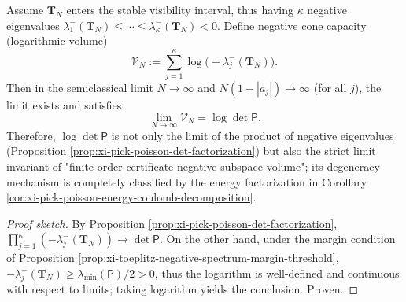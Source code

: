 \begin{corollary}\label{cor:xi-toeplitz-negative-log-volume-limit}
Assume \(\mathbf{T}_N\) enters the stable visibility interval, thus having \(\kappa\) negative eigenvalues
\(\lambda_1^{-}(\mathbf{T}_N)\le\cdots\le\lambda_{\kappa}^{-}(\mathbf{T}_N)<0\).
Define negative cone capacity (logarithmic volume)
\[
\mathcal{V}_N:=\sum_{j=1}^{\kappa}\log\bigl(-\lambda_j^{-}(\mathbf{T}_N)\bigr).
\]
Then in the semiclassical limit \(N\to\infty\) and \(N(1-|a_j|)\to\infty\) (for all \(j\)), the limit exists and satisfies
\[
\boxed{\;
\lim_{N\to\infty}\mathcal{V}_N=\log\det\mathsf P.\;}
\]
Therefore, \(\log\det\mathsf P\) is not only the limit of the product of negative eigenvalues (Proposition \ref{prop:xi-pick-poisson-det-factorization}) but also the strict limit invariant of "finite-order certificate negative subspace volume"; its degeneracy mechanism is completely classified by the energy factorization in Corollary \ref{cor:xi-pick-poisson-energy-coulomb-decomposition}.
\end{corollary}
\begin{proof}[Proof sketch]
By Proposition \ref{prop:xi-pick-poisson-det-factorization},
\(
\prod_{j=1}^{\kappa}(-\lambda_j^{-}(\mathbf{T}_N))\to \det\mathsf P
\).
On the other hand, under the margin condition of Proposition \ref{prop:xi-toeplitz-negative-spectrum-margin-threshold},
\(-\lambda_j^{-}(\mathbf{T}_N)\ge \lambda_{\min}(\mathsf P)/2>0\),
thus the logarithm is well-defined and continuous with respect to limits; taking logarithm yields the conclusion. Proven.
\end{proof}

